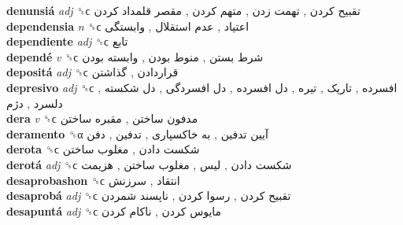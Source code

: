 \textbf{denunsiá} \emph{adj}  ␝ϲ   تقبیح کردن ,  تهمت زدن ,  متهم کردن ,  مقصر قلمداد کردن   \\
\textbf{dependensia} \emph{n}  ␝ϲ   اعتیاد ,  عدم استقلال ,  وابستگی   \\
\textbf{dependiente} \emph{adj}  ␝ϲ   تابع   \\
\textbf{dependé} \emph{v}  ␝ϲ   شرط بستن ,  منوط بودن ,  وابسته بودن   \\
\textbf{depositá} \emph{adj}  ␝ϲ   قراردادن ,  گذاشتن   \\
\textbf{depresivo} \emph{adj}  ␝ϲ   افسرده ,  تاریک ,  تیره ,  دل افسرده ,  دل افسردگی ,  دل شکسته ,  دلسرد ,  دژم   \\
\textbf{dera} \emph{v}  ␝ϲ   مدفون ساختن ,  مقبره ساختن   \\
\textbf{deramento} ␝α   آیین تدفین ,  به خاکسپاری ,  تدفین ,  دفن   \\
\textbf{derota} ␝ϲ   شکست دادن ,  مغلوب ساختن   \\
\textbf{derotá} \emph{adj}  ␝ϲ   شکست دادن ,  لیس ,  مغلوب ساختن ,  هزیمت   \\
\textbf{desaprobashon} ␝ϲ   انتقاد ,  سرزنش   \\
\textbf{desaprobá} \emph{adj}  ␝ϲ   تقبیح کردن ,  رسوا کردن ,  ناپسند شمردن   \\
\textbf{desapuntá} \emph{adj}  ␝ϲ   مایوس کردن ,  ناکام کردن   \\

